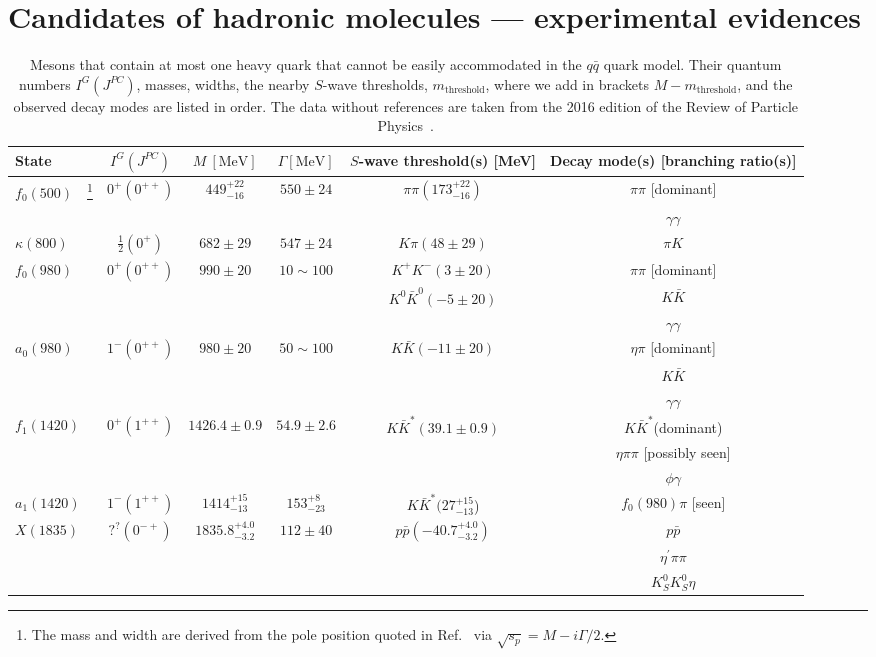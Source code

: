
\section{Candidates of hadronic molecules --- experimental evidences}
\label{sec:2}

\begin{table*}[tbh]
 \caption{Mesons that contain at most one heavy quark that cannot be easily
 accommodated in the $q\bar q$ quark model.
  Their quantum numbers $I^G(J^{PC})$, masses, widths,
 the nearby $S$-wave thresholds, $m_{\text{threshold}}$, where we add in 
 brackets $M-m_{\text{threshold}}$, and the observed decay modes are listed in 
 order. The data without references are taken from the 2016 edition of the 
 Review of Particle Physics~\cite{Olive:2016xmw}.  
 }
 \begin{ruledtabular}
  \begin{tabular}{l c c c c c}
State & $I^G(J^{PC})$ & $M \ [\mathrm{MeV}]$ & $\Gamma[\mathrm{MeV}]$ & $S$-wave
threshold(s) [MeV] & Decay mode(s) [branching ratio(s)]\tabularnewline
\hline
$f_{0}(500)$~\cite{Pelaez:2015qba}~\footnote{The mass and width
are derived from the pole position quoted in Ref.~\cite{Pelaez:2015qba} via
$\sqrt{s_p}=M-i\Gamma/2$. } & $0^{+}(0^{++})$ & $449^{+22}_{-16}$ & $550\pm 24$
& $\pi\pi(173^{+22}_{-16})$ & $\pi\pi$ [dominant]\tabularnewline &  &  &  &  &
$\gamma\gamma$\tabularnewline
\hline
$\kappa(800)$ & $\frac{1}{2}(0^{+})$ & $682\pm29$ & $547\pm24$ & $K\pi(48\pm 29)$ & $\pi K$\tabularnewline
\hline
$f_{0}(980)$ & $0^{+}(0^{++})$ & $990\pm20$ & $10\sim100$ & $K^+K^-(3\pm20)$ &
$\pi\pi$ [dominant]\tabularnewline &  &  &  & $K^0\bar{K}^0(-5\pm20)$ &
$K\bar{K}$\tabularnewline &  &  &  &  & $\gamma\gamma$\tabularnewline
\hline
$a_{0}(980)$ & $1^{-}(0^{++})$ & $980\pm20$ & $50\sim100$ & $K\bar{K}(-11\pm20)$
& $\eta\pi$ [dominant]\tabularnewline &  &  &  &  & $K\bar{K}$\tabularnewline
 &  &  &  &  & $\gamma\gamma$\tabularnewline
\hline
$f_{1}(1420)$ & $0^{+}(1^{++})$ & $1426.4\pm0.9$ & $54.9\pm2.6$ & $K\bar{K}^{*}(39.1\pm0.9)$ & $K\bar{K}^{*}$(dominant)\tabularnewline
 &  &  &  &  & $\eta\pi\pi$ [possibly seen]\tabularnewline
 &  &  &  &  & $\phi\gamma$\tabularnewline
\hline
$a_{1}(1420)$ & $1^{-}(1^{++})$ & $1414_{-13}^{+15}$ & $153_{-23}^{+8}$ & $K\bar{K}^{*}(27^{+15}_{-13}$) &
$f_{0}(980)\pi$ [seen]\tabularnewline
\hline
$X(1835)$ & $?^{?}(0^{-+})$ & $1835.8_{-3.2}^{+4.0}$ & $112\pm40$ & $p\bar{p}(-40.7^{+4.0}_{-3.2})$ & $p\bar{p}$\tabularnewline
 &  &  &  &  & $\eta^{\prime}\pi\pi$\tabularnewline
 &  &  &  &  & $K_{S}^{0}K_{S}^{0}\eta$\tabularnewline

\end{tabular}
\end{ruledtabular}
\end{table*}
